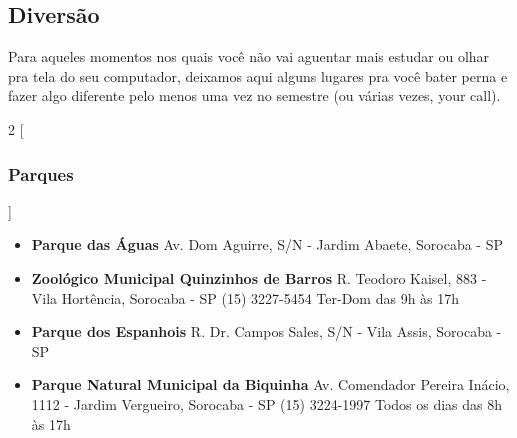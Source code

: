 \subsection{Diversão}
Para aqueles momentos nos quais você não vai aguentar mais estudar ou olhar pra tela do seu computador, deixamos aqui alguns lugares pra você bater perna e fazer algo diferente pelo menos uma vez no semestre (ou várias vezes, your call).

\begin{multicols}{2}
  [
  \subsubsection{Parques}
  ]
  \begin{itemize}
    \item \textbf{Parque das Águas}
      \newline Av. Dom Aguirre, S/N - Jardim Abaete, Sorocaba - SP
  \end{itemize}
  \begin{itemize}
    \item \textbf{Zoológico Municipal Quinzinhos de Barros}
      \newline R. Teodoro Kaisel, 883 - Vila Hortência, Sorocaba - SP
      \newline (15) 3227-5454
      \newline Ter-Dom das 9h às 17h
  \end{itemize}
  \begin{itemize}
    \item \textbf{Parque dos Espanhois}
      \newline R. Dr. Campos Sales, S/N - Vila Assis, Sorocaba - SP
  \end{itemize}
  \begin{itemize}
    \item \textbf{Parque Natural Municipal da Biquinha}
      \newline Av. Comendador Pereira Inácio, 1112 - Jardim Vergueiro, Sorocaba - SP
      \newline (15) 3224-1997
      \newline Todos os dias das 8h às 17h
  \end{itemize}
\end{multicols}


